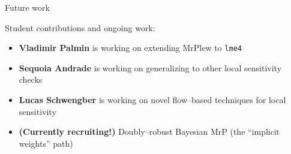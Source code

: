 

\begin{frame}{Future work}

Student contributions and ongoing work:

\begin{itemize}
\item \textbf{Vladimir Palmin} is working on extending MrPlew to \texttt{lme4}
\item \textbf{Sequoia Andrade} is working on generalizing to other local sensitivity checks
\item \textbf{Lucas Schwengber} is working on novel flow--based techniques for local sensitivity
\item \textbf{(Currently recruiting!)} Doubly--robust Bayesian MrP (the ``implicit weights'' path)
\end{itemize}



\end{frame}
